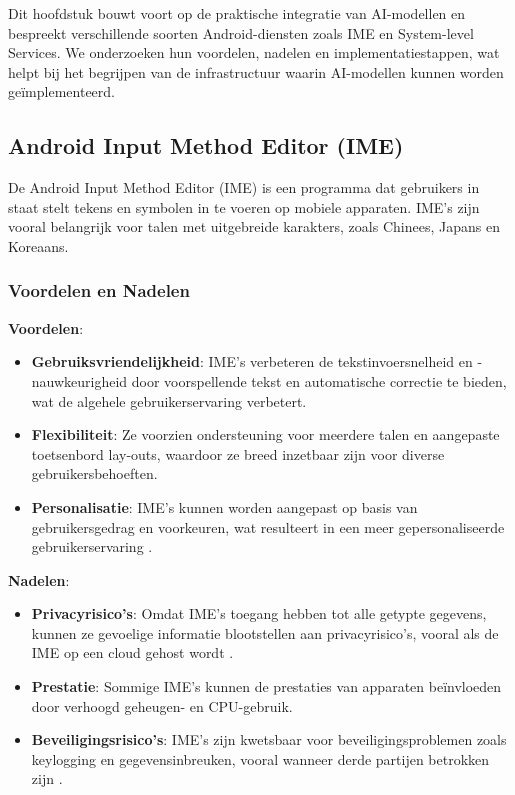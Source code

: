Dit hoofdstuk bouwt voort op de praktische integratie van AI-modellen en bespr\-eekt verschillende soorten Android-diensten zoals IME en System-level Services. We onderzoeken hun voordelen, nadelen en implementatiestappen, wat helpt bij het begrijpen van de infrastructuur waarin AI-modellen kunnen worden geïmplementeerd.


\subsection{Android Input Method Editor (IME)}

De Android Input Method Editor (IME) is een programma dat gebruikers in staat stelt tekens en symbolen in te voeren op mobiele apparaten. IME's zijn vooral belangrijk voor talen met uitgebreide karakters, zoals Chinees, Japans en Koreaans.

\subsubsection{Voordelen en Nadelen}

\textbf{Voordelen}:
\begin{itemize}
    \item \textbf{Gebruiksvriendelijkheid}: IME's verbeteren de tekstinvoersnelheid en -nauw\-keu\-rig\-heid door voorspellende tekst en automatische correctie te bieden, wat de algehele gebruikerservaring verbetert.
    \item \textbf{Flexibiliteit}: Ze voorzien ondersteuning voor meerdere talen en aangepaste toetsenbord lay-outs, waardoor ze breed inzetbaar zijn voor diverse gebruikersbehoeften.
    \item \textbf{Personalisatie}: IME's kunnen worden aangepast op basis van gebruikersgedrag en voorkeuren, wat resulteert in een meer gepersonaliseerde gebruikerservaring \autocite{Jo2015}.
\end{itemize}

\textbf{Nadelen}:
\begin{itemize}
    \item \textbf{Privacyrisico's}: Omdat IME's toegang hebben tot alle getypte gegevens, kunnen ze gevoelige informatie blootstellen aan privacyrisico's, vooral als de IME op een cloud gehost wordt \autocite{Kawamoto2014}.
    \item \textbf{Prestatie}: Sommige IME's kunnen de prestaties van apparaten beïnvloeden door verhoogd geheugen- en CPU-gebruik.
    \item \textbf{Beveiligingsrisico's}: IME's zijn kwetsbaar voor beveiligingsproblemen zoals keylogging en gegevensinbreuken, vooral wanneer derde partijen betrokken zijn \autocite{Diao2015}.
\end{itemize}

